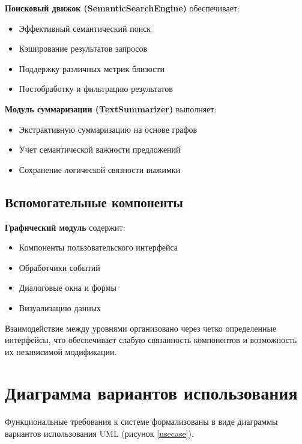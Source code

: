 \textbf{Поисковый движок (SemanticSearchEngine)} обеспечивает:
\begin{itemize}
	\item Эффективный семантический поиск
	\item Кэширование результатов запросов
	\item Поддержку различных метрик близости
	\item Постобработку и фильтрацию результатов
\end{itemize}

\textbf{Модуль суммаризации (TextSummarizer)} выполняет:
\begin{itemize}
	\item Экстрактивную суммаризацию на основе графов
	\item Учет семантической важности предложений
	\item Сохранение логической связности выжимки
\end{itemize}

\subsection{Вспомогательные компоненты}

\textbf{Графический модуль} содержит:
\begin{itemize}
	\item Компоненты пользовательского интерфейса
	\item Обработчики событий
	\item Диалоговые окна и формы
	\item Визуализацию данных
\end{itemize}

Взаимодействие между уровнями организовано через четко определенные интерфейсы, что обеспечивает слабую связанность компонентов и возможность их независимой модификации.

\section{Диаграмма вариантов использования}

Функциональные требования к системе формализованы в виде диаграммы вариантов использования UML (рисунок \ref{usecase}).

